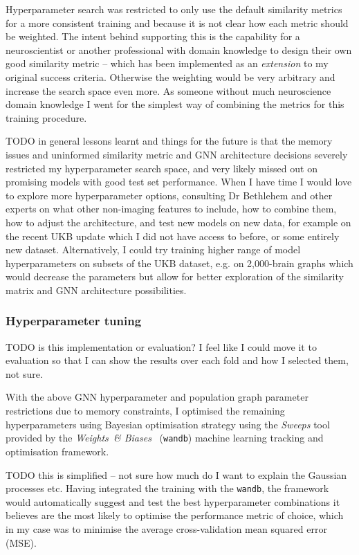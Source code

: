 Hyperparameter search was restricted to only use the default similarity metrics for a more consistent training and because it is not clear how each metric should be weighted. The intent behind supporting this is the capability for a neuroscientist or another professional with domain knowledge to design their own good similarity metric – which has been implemented as an \textit{extension} to my original success criteria. Otherwise the weighting would be very arbitrary and increase the search space even more. As someone without much neuroscience domain knowledge I went for the simplest way of combining the metrics for this training procedure.

TODO in general lessons learnt and things for the future is that the memory issues and uninformed similarity metric and GNN architecture decisions severely restricted my hyperparameter search space, and very likely missed out on promising models with good test set performance. When I have time I would love to explore more hyperparameter options, consulting Dr Bethlehem and other experts on what other non-imaging features to include, how to combine them, how to adjust the architecture, and test new models on new data, for example on the recent UKB update which I did not have access to before, or some entirely new dataset. Alternatively, I could try training higher range of model hyperparameters on subsets of the UKB dataset, e.g. on 2,000-brain graphs which would decrease the parameters but allow for better exploration of the similarity matrix and GNN architecture possibilities.


\subsubsection{Hyperparameter tuning}
TODO is this implementation or evaluation? I feel like I could move it to evaluation so that I can show the results over each fold and how I selected them, not sure.

With the above GNN hyperparameter and population graph parameter restrictions due to memory constraints, I optimised the remaining hyperparameters using Bayesian optimisation strategy using the \textit{Sweeps} tool provided by the \textit{Weights~\& Biases}~\cite{wandb} (\texttt{wandb}) machine learning tracking and optimisation framework. 

TODO this is simplified – not sure how much do I want to explain the Gaussian processes etc.
Having integrated the training with the \texttt{wandb}, the framework would automatically suggest and test the best hyperparameter combinations it believes are the most likely to optimise the performance metric of choice, which in my case was to minimise the average cross-validation mean squared error (MSE). 

